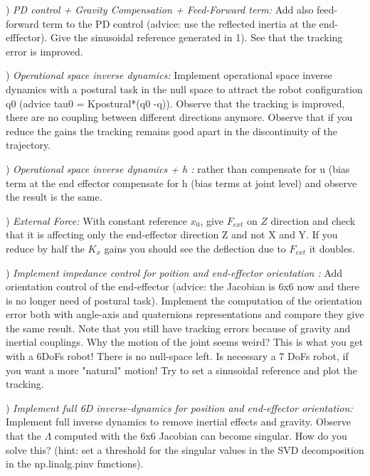 \documentclass{report}
\begin{document}
\quad

) \textit{PD control  + Gravity Compensation + Feed-Forward term:}
Add also feed-forward term to the PD control (advice: use the reflected inertia at the end-efffector). Give the sinusoidal reference generated in 1). See that the tracking error is improved. 

\quad

) \textit{Operational space inverse dynamics:}
Implement operational space inverse dynamics with a postural task in the null space to attract the robot configuration q0 (advice tau0 = Kpostural*(q0 -q)).  Observe that the tracking is improved, there are no coupling between different directions anymore.  Observe that if you reduce the gains the tracking remains good apart in the discontinuity of the trajectory.  

\quad

) \textit{Operational space inverse dynamics + h :}
rather than compensate for u (bias term at the end effector  compensate for h (bias terms at joint level) and observe the result is the same.

\quad

) \textit{External Force:}
With constant reference $x_0$,  give $F_{ext}$ on $Z$ direction and check that it is affecting only the end-effector direction Z and not X and Y. If you reduce by half  the $K_x$ gains you should see the deflection due to $F_{ext}$ it doubles.

\quad

) \textit{Implement impedance control for poition and end-effector orientation :}
Add orientation  control of the end-effector (advice: the Jacobian is 6x6 now and there is no longer need of postural task). Implement the computation of the orientation error both with angle-axis and quaternions representations and compare they give the same result.
Note that you still have tracking errors because of gravity and inertial couplings.
Why the motion of the joint seems weird? This is what you get with a 6DoFs robot! There is no null-space left. Is necessary a 7 DoFs robot, if you want a more "natural" motion! Try to set a sinusoidal reference and plot the tracking.
 
 \quad
 
 ) \textit{Implement full 6D inverse-dynamics  for position and end-effector orientation:}
Implement full inverse dynamics to remove inertial effects and gravity.
Observe that the $\Lambda$ computed with the 6x6 Jacobian can become singular. How do you solve this?
(hint: set a threshold for the singular values in the SVD decomposition in the np.linalg.pinv functions). 
 
\end{document}
